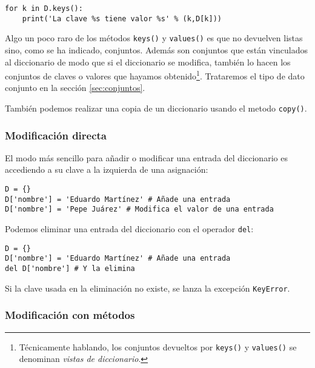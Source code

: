 \begin{lstlisting}
for k in D.keys():
    print('La clave %s tiene valor %s' % (k,D[k]))
\end{lstlisting}

Algo un poco raro de los métodos \texttt{keys()} y \texttt{values()} es que no devuelven listas sino, como se ha indicado, conjuntos. Además son conjuntos que están vinculados al diccionario de modo que si el diccionario se modifica, también lo hacen los conjuntos de claves o valores que hayamos obtenido\footnote{Técnicamente hablando, los conjuntos devueltos por \texttt{keys()} y \texttt{values()} se denominan \emph{vistas de diccionario}.}. Trataremos el tipo de dato conjunto en la sección \ref{sec:conjuntos}. 

También podemos realizar una copia de un diccionario usando el metodo \texttt{copy()}.

\subsubsection{Modificación directa}

El modo más sencillo para añadir o modificar una entrada del diccionario es accediendo a su clave a la izquierda de una asignación:

\begin{lstlisting}
D = {}
D['nombre'] = 'Eduardo Martínez' # Añade una entrada
D['nombre'] = 'Pepe Juárez' # Modifica el valor de una entrada
\end{lstlisting}

Podemos eliminar una entrada del diccionario con el operador \texttt{del}:

\begin{lstlisting}
D = {}
D['nombre'] = 'Eduardo Martínez' # Añade una entrada
del D['nombre'] # Y la elimina
\end{lstlisting}

Si la clave usada en la eliminación no existe, se lanza la excepción \texttt{KeyError}.

\subsubsection{Modificación con métodos}

